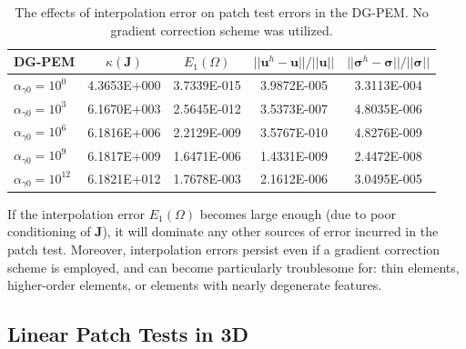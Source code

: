 \begin{table}[!ht]
  \begin{center}
    \begin{tabular}{| l || c | c | c | c |}
    \hline
    DG-PEM & $\kappa(\mathbf{J})$ &  $E_1 (\Omega)$ & $||\mathbf{u}^h - \mathbf{u}|| / ||\mathbf{u}||$ & $||\boldsymbol{\sigma}^h - \boldsymbol{\sigma}|| / ||\boldsymbol{\sigma}||$ \\ \hline \hline
    $\alpha_{\gamma0} = 10^{0}$ & 4.3653E+000 & 3.7339E-015 & 3.9872E-005 & 3.3113E-004 \\ \hline
    $\alpha_{\gamma0} = 10^{3}$ & 6.1670E+003 & 2.5645E-012 & 3.5373E-007 & 4.8035E-006 \\ \hline
    $\alpha_{\gamma0} = 10^{6}$ & 6.1816E+006 & 2.2129E-009 & 3.5767E-010 & 4.8276E-009 \\ \hline
    $\alpha_{\gamma0} = 10^{9}$ & 6.1817E+009 & 1.6471E-006 & 1.4331E-009 & 2.4472E-008 \\ \hline
    $\alpha_{\gamma0} = 10^{12}$ & 6.1821E+012 & 1.7678E-003 & 2.1612E-006 & 3.0495E-005 \\
    \hline
    \end{tabular}
    \caption{The effects of interpolation error on patch test errors in the DG-PEM. No gradient correction scheme was utilized.}
    \vspace{-5pt}
    \label{tab:interpolation_patch_test_error}
    \vspace{-10pt}
  \end{center}
\end{table}

If the interpolation error $E_1 (\Omega)$ becomes large enough (due to poor conditioning of $\mathbf{J}$), it will dominate any other sources of error incurred in the patch test. Moreover, interpolation errors persist even if a gradient correction scheme is employed, and can become particularly troublesome for: thin elements, higher-order elements, or elements with nearly degenerate features.

\subsection*{Linear Patch Tests in 3D}


